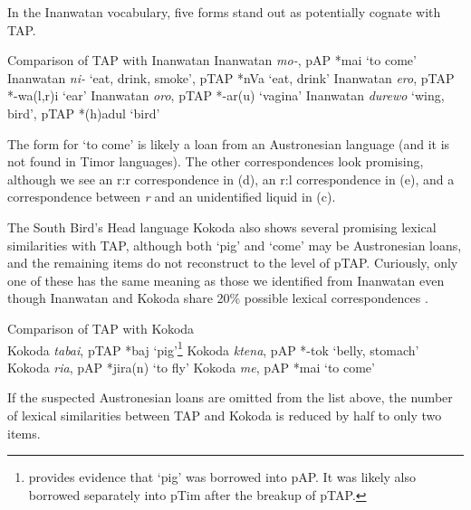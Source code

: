 In the Inanwatan vocabulary, five forms stand out as potentially cognate with TAP.

\ea%
\label{ex:4:56}
\upshape 
  Comparison of TAP with Inanwatan \citep{DeVries2004} 
  \ea \upshape Inanwatan \textit{mo-}, pAP *mai `to come'
  \ex \upshape Inanwatan \textit{ni- }`eat, drink, smoke', pTAP *nVa `eat, drink'
  \ex \upshape Inanwatan \textit{{\textglotstop}}\textit{ero}, pTAP *-wa(l,r)i `ear'
  \ex \upshape Inanwatan \textit{oro}, pTAP *-ar(u) `vagina'
  \ex \upshape Inanwatan \textit{durewo} `wing, bird', pTAP *(h)adul `bird'
  \z
\z


The form for `to come' is likely a loan from an Austronesian language (and it is not found in Timor languages). The other correspondences look promising, although we see an r:r correspondence in (d), an r:l correspondence in (e), and a correspondence between \textit{r} and an unidentified liquid in (c).

The South Bird's Head language Kokoda also shows several promising lexical similarities with TAP, although both `pig' and `come' may be Austronesian loans, and the remaining items do not reconstruct to the level of pTAP. Curiously, only one of these has the same meaning as those we identified from Inanwatan even though Inanwatan and Kokoda share 20\% possible lexical correspondences \citep[133]{DeVries2004}.



\ea%
\label{ex:4:57}
\upshape 
  Comparison of TAP with Kokoda \citep{DeVries2004} \\
  \ea \upshape Kokoda \textit{ta{\textprimstress}bai}, pTAP *baj `pig'\footnote{\citet{Robinsontaalorpantar} provides evidence that `pig' was borrowed into pAP. It was likely also borrowed separately into pTim after the breakup of pTAP.}
  \ex \upshape  Kokoda \textit{k{\textopeno}{\textprimstress}tena}, pAP *-tok `belly, stomach'
  \ex \upshape  Kokoda \textit{{\textprimstress}{\textbardotlessj}{\textepsilon}ria}, pAP *jira(n) `to fly'
  \ex \upshape  Kokoda \textit{m{\textopeno}e}, pAP *mai `to come' 
  \z
\z

If the suspected Austronesian loans are omitted from the list above, the number of lexical similarities between TAP and Kokoda is reduced by half to only two items.

